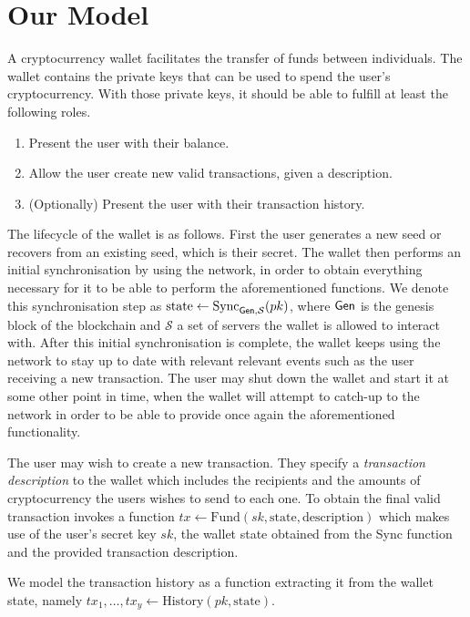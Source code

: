 \section{Our Model}
\label{model}
A cryptocurrency wallet facilitates the transfer of funds between individuals. The wallet contains the private keys that can be used to spend the user's cryptocurrency. With those private keys, it should be able to fulfill at least the following roles.

\begin{enumerate}
    \item Present the user with their balance.
    \item Allow the user create new valid transactions, given a description.
    \item (Optionally) Present the user with their transaction history.
\end{enumerate}

The lifecycle of the wallet is as follows. First the user generates a new seed or recovers from an existing seed, which is their secret. The wallet then performs an initial synchronisation by using the network, in order to obtain everything necessary for it to be able to perform the aforementioned functions. We denote this synchronisation step as $\text{state} \gets \text{Sync}_{\textsf{Gen}, \mathcal{S}}(pk)$, where $\textsf{Gen}$ is the genesis block of the blockchain and $\mathcal{S}$ a set of servers the wallet is allowed to interact with. After this initial synchronisation is complete, the wallet keeps using the network to stay up to date with relevant relevant events such as the user receiving a new transaction. The user may shut down the wallet and start it at some other point in time, when the wallet will attempt to catch-up to the network in order to be able to provide once again the aforementioned functionality.

The user may wish to create a new transaction. They specify a \emph{transaction description} to the wallet which includes the recipients and the amounts of cryptocurrency the users wishes to send to each one. To obtain the final valid transaction invokes a function $tx \gets \text{Fund}(sk, \text{state}, \text{description})$ which makes use of the user's secret key $sk$, the wallet state obtained from the Sync function and the provided transaction description.

We model the transaction history as a function extracting it from the wallet state, namely $tx_1, \dots, tx_y \gets \text{History}(pk, \text{state})$.

